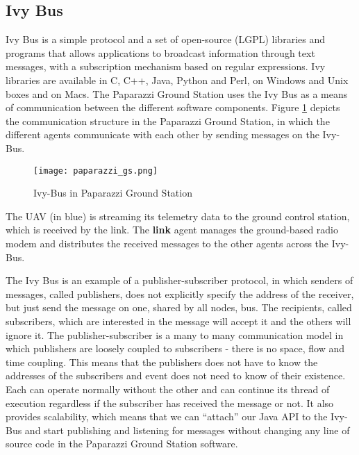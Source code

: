 \subsection{Ivy Bus}
Ivy Bus is a simple protocol and a set of open-source (LGPL) libraries and programs that allows applications to broadcast information through text messages, with a subscription mechanism based on regular expressions. Ivy libraries are available in C, C++, Java, Python and Perl, on Windows and Unix boxes and on Macs. The Paparazzi Ground Station uses the Ivy Bus as a means of communication between the different software components. Figure \ref{fig:paparazziGS} depicts the communication structure in the Paparazzi Ground Station, in which the different agents communicate with each other by sending messages on the Ivy-Bus.

\begin{figure}[h!]
 \begin{center}
  \texttt{[image: paparazzi\_gs.png]}
 \end{center}
  \caption{Ivy-Bus in Paparazzi Ground Station\label{fig:paparazziGS}}
\end{figure}

The UAV (in blue) is streaming its telemetry data to the ground control station, which is received by the link. The \textbf{link} agent manages the ground-based radio modem and distributes the received messages to the other agents across the Ivy-Bus.

The Ivy Bus is an example of a publisher-subscriber protocol, in which senders of messages, called publishers, does not  explicitly specify the address of the receiver, but just send the message on one, shared by all nodes, bus. The recipients, called subscribers, which are interested in the message will accept it and the others will ignore it. The publisher-subscriber is a many to many communication model in which publishers are loosely coupled to subscribers - there is no space, flow and time coupling. This means that the publishers does not have to know the addresses of the subscribers and event does not need to know of their existence. Each can operate normally without the other and can continue its thread of execution regardless if the subscriber has received the message or not. It also provides scalability, which means that we can “attach” our Java API to the Ivy-Bus and start publishing and listening for messages without changing any line of source code in the Paparazzi Ground Station software.

